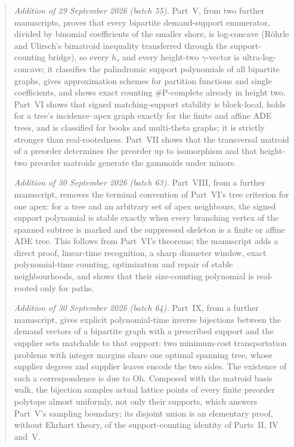 \documentclass[11pt]{article}
\numberwithin{equation}{section}
\theoremstyle{definition}
\begin{document}
\begin{abstract}
\emph{Addition of 29 September 2026 (batch 55).} Part~V, from two further
manuscripts, proves that every bipartite demand-support enumerator, divided
by binomial coefficients of the smaller shore, is log-concave (R\"ohrle and
Ulirsch's bimatroid inequality transferred through the support-counting
bridge), so every $h_\tau$ and every height-two $\gamma$-vector is
ultra-log-concave; it classifies the palindromic support polynomials of all
bipartite graphs, gives approximation schemes for partition functions and
single coefficients, and shows exact counting $\#$P-complete already in
height two. Part~VI shows that signed matching-support stability is
block-local, holds for a tree's incidence--apex graph exactly for the finite
and affine ADE trees, and is classified for books and multi-theta graphs;
it is strictly stronger than real-rootedness. Part~VII shows that the
transversal matroid of a preorder determines the preorder up to isomorphism
and that height-two preorder matroids generate the gammoids under minors.

\emph{Addition of 30 September 2026 (batch 63).} Part~VIII, from a further
manuscript, removes the terminal convention of Part~VI's tree criterion for
one apex: for a tree and an arbitrary set of apex neighbours, the signed
support polynomial is stable exactly when every branching vertex of the
spanned subtree is marked and the suppressed skeleton is a finite or
affine ADE tree. This follows from Part~VI's theorems; the manuscript adds
a direct proof, linear-time recognition, a sharp diameter window, exact
polynomial-time counting, optimization and repair of stable neighbourhoods,
and shows that their size-counting polynomial is real-rooted only for
paths.

\emph{Addition of 30 September 2026 (batch 64).} Part~IX, from a further
manuscript, gives explicit polynomial-time inverse bijections between the
demand vectors of a bipartite graph with a prescribed support and the
supplier sets matchable to that support: two minimum-cost transportation
problems with integer margins share one optimal spanning tree, whose
supplier degrees and supplier leaves encode the two sides. The existence
of such a correspondence is due to Oh. Composed with the matroid basis
walk, the bijection samples actual lattice points of every finite preorder
polytope almost uniformly, not only their supports, which answers
Part~V's sampling boundary; its disjoint union is an elementary proof,
without Ehrhart theory, of the support-counting identity of Parts~II, IV
and~V.
\end{abstract}
\end{document}
